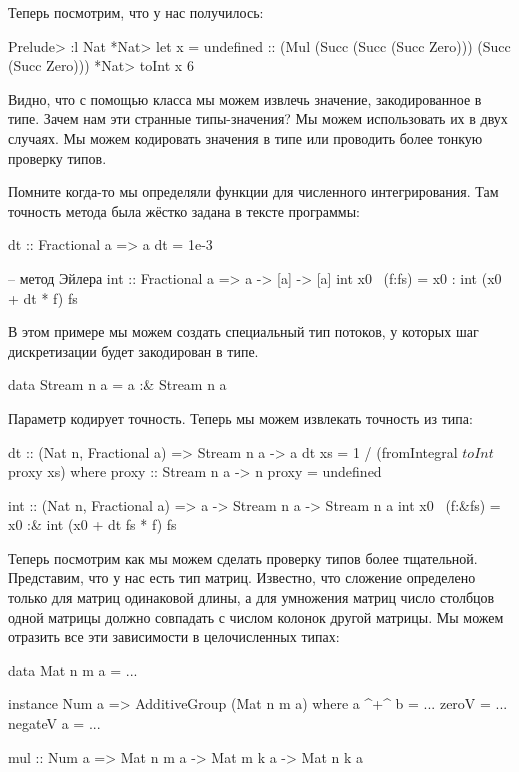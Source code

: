 Теперь посмотрим, что у нас получилось:

\begin{code}
Prelude> :l Nat
*Nat> let x = undefined :: (Mul (Succ (Succ (Succ Zero))) (Succ (Succ Zero)))
*Nat> toInt x
6
\end{code}

Видно, что с помощью класса  мы можем извлечь значение,
закодированное в типе. Зачем нам эти странные типы-значения? 
Мы можем использовать их в двух случаях. Мы можем кодировать
значения в типе или проводить более тонкую проверку типов.

Помните когда-то мы определяли функции для численного 
интегрирования. Там точность метода была жёстко задана
в тексте программы:


\begin{code}

dt :: Fractional a => a
dt = 1e-3

-- метод Эйлера
int :: Fractional a => a -> [a] -> [a]
int x0 ~(f:fs) = x0 : int (x0 + dt * f) fs
\end{code}

В этом примере мы можем создать специальный тип
потоков, у которых шаг дискретизации будет закодирован
в типе. 

\begin{code}
data Stream n a = a :& Stream n a
\end{code}

Параметр  кодирует точность. Теперь мы можем
извлекать точность из типа:

\begin{code}
dt :: (Nat n, Fractional a) => Stream n a -> a
dt xs = 1 / (fromIntegral $ toInt $ proxy xs)
    where proxy :: Stream n a -> n
          proxy = undefined

int :: (Nat n, Fractional a) => a -> Stream n a -> Stream n a
int x0 ~(f:&fs) = x0 :& int (x0 + dt fs * f) fs
\end{code}

Теперь посмотрим как мы можем сделать проверку типов более
тщательной. Представим, что у нас есть тип матриц. 
Известно, что сложение определено только для матриц
одинаковой длины, а для умножения матриц число столбцов одной матрицы
должно совпадать с числом колонок другой матрицы. Мы можем отразить
все эти зависимости в целочисленных типах:


\begin{code}
data Mat n m a = ...

instance Num a => AdditiveGroup (Mat n m a) where
    a ^+^ b     = ...
    zeroV       = ...
    negateV a   = ...

mul :: Num a => Mat n m a -> Mat m k a -> Mat n k a
\end{code}

